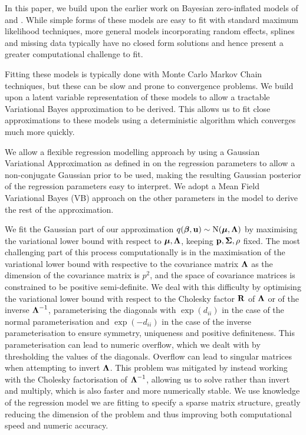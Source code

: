 \documentclass{article}[12pt]
\begin{document}
In this paper, we build upon the earlier work on Bayesian zero-inflated models of \cite{Ghosh20061360} and
\cite{VatsaWilson2014}. While simple forms of these models are easy to fit with standard maximum likelihood
techniques, more general models incorporating random effects, splines and missing data typically have no
closed form solutions and hence present a greater computational challenge to fit.

Fitting these models is typically done with Monte Carlo Markov Chain techniques, but these can be slow and
prone to convergence problems. We build upon a latent variable representation of these models to allow a
tractable Variational Bayes approximation to be derived. This allows us to fit close approximations to these
models using a deterministic algorithm which converges much more quickly.

We allow a flexible regression modelling approach by using a Gaussian Variational Approximation as defined in
\cite{ormerod09} on the regression parameters to allow a non-conjugate Gaussian prior to be used, making the
resulting Gaussian posterior of the regression parameters easy to interpret. We adopt a Mean Field Variational
Bayes (VB) approach on the other parameters in the model to derive the rest of the approximation.

We fit the Gaussian part of our approximation $q({\boldsymbol \beta}, {\bf u}) \sim \text{N}({\boldsymbol \mu}, {\boldsymbol \Lambda})$ by maximising the
variational lower bound with respect to ${\boldsymbol \mu}, {\boldsymbol \Lambda}$, keeping ${\bf p}, {\boldsymbol \Sigma}, \rho$ fixed. The most
challenging part of this process computationally is in the maximisation of the variational lower bound with
respective to the covariance matrix ${\boldsymbol \Lambda}$ as the dimension of the covariance matrix is $p^2$, and the
space of covariance matrices is constrained to be positive semi-definite. We deal with this difficulty by
optimising the variational lower bound with respect to the Cholesky factor ${\bf R}$ of ${\boldsymbol \Lambda}$ or of the
inverse ${\boldsymbol \Lambda}^{-1}$, parameterising the diagonals with $\exp{(d_{ii})}$ in the case of the normal
parameterisation and $\exp{(-d_{ii})}$ in the case of the inverse parameterisation to ensure symmetry,
uniqueness and positive definiteness. This parameterisation can lead to numeric overflow, which we dealt with
by thresholding the values of the  diagonals. Overflow can lead to singular matrices when attempting to invert
${\boldsymbol \Lambda}$. This problem was mitigated by  instead working with the Cholesky factorisation of ${\boldsymbol \Lambda}^{-1}$,
allowing us to solve rather than invert and multiply, which is also faster and more numerically stable. We use
knowledge of the regression model we are fitting to specify a sparse matrix structure, greatly  reducing the
dimension of the problem and thus improving both computational speed and numeric accuracy.
\end{document}

